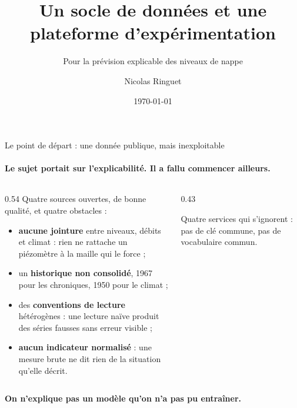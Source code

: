 \documentclass[aspectratio=169,11pt]{beamer}
\title{Un socle de données et une plateforme d'expérimentation}
\subtitle{Pour la prévision explicable des niveaux de nappe}
\author{Nicolas Ringuet}
\date{\today}
\newcommand{\titrecourt}{Socle de données et plateforme \textbullet{} ARD JUNON}
\begin{document}
\renewcommand{\insertshorttitle}{\titrecourt}

\pagetitre

\begin{frame}{Le point de départ : une donnée publique, mais inexploitable}
\framesubtitle{Le sujet portait sur l'explicabilité. Il a fallu commencer ailleurs.}

\begin{columns}[T]
\begin{column}{0.54\textwidth}
\small
Quatre sources ouvertes, de bonne qualité, et quatre obstacles :
\begin{itemize}\itemsep0.35em
  \item \textbf{aucune jointure} entre niveaux, débits et climat : rien ne rattache
        un piézomètre à la maille qui le force ;
  \item un \textbf{historique non consolidé}, 1967 pour les chroniques, 1950 pour le climat ;
  \item des \textbf{conventions de lecture} hétérogènes : une lecture naïve produit des
        séries fausses sans erreur visible ;
  \item \textbf{aucun indicateur normalisé} : une mesure brute ne dit rien de la situation
        qu'elle décrit.
\end{itemize}
\end{column}

\begin{column}{0.43\textwidth}
\vspace{0.6cm}
\begin{center}
\end{center}
\vspace{0.3cm}
{\footnotesize\color{grisardoise}
Quatre services qui s'ignorent : pas de clé commune, pas de vocabulaire commun.}
\end{column}
\end{columns}

\vspace{0.35cm}
\begin{center}
{\color{bleuprofond}\bfseries On n'explique pas un modèle qu'on n'a pas pu entraîner.}
\end{center}
\end{frame}
\end{document}
